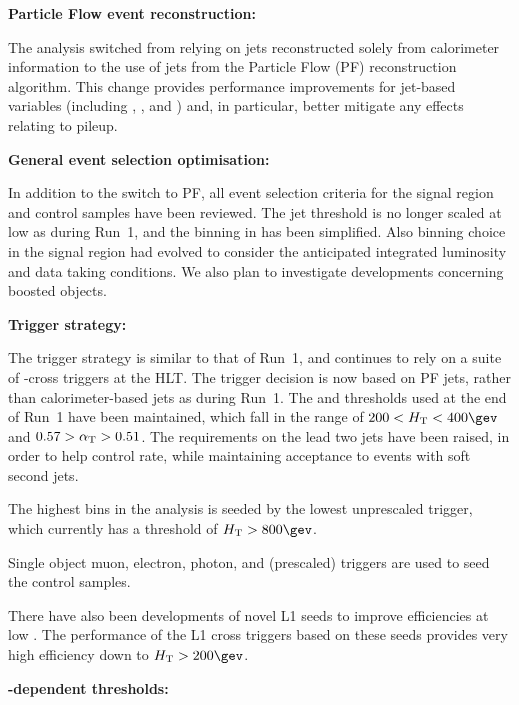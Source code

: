 {\bf Particle Flow event reconstruction:}

The analysis switched from relying on jets reconstructed solely
from calorimeter information to the use of jets from the Particle Flow
(PF) reconstruction algorithm. This change provides performance
improvements for jet-based variables (including \scalht, \mht, and
\alphat) and, in particular, better mitigate any effects relating to
pileup.

{\bf General event selection optimisation:}

In addition to the switch to PF, all event selection criteria for the
signal region and control samples have been reviewed. The jet
\Pt threshold is no longer scaled at low \scalht as during Run~1, and
the binning in \scalht has been simplified. Also binning choice in the
signal region had evolved to consider the anticipated integrated luminosity and 
data taking conditions.  We also plan to investigate developments concerning 
\eg boosted objects.

{\bf Trigger strategy:}

The trigger strategy is similar to that of Run~1, and continues
to rely on a suite of \scalht-\alphat cross triggers at the HLT. The
trigger decision is now based on PF jets, rather than
calorimeter-based jets as during Run~1. The \HT and \alphat thresholds
used at the end of Run~1 have been maintained, which fall in the range
of $200 < \scalht < 400\gev$ and $0.57 > \alpha_{\text{T}} > 0.51$. The \Pt
requirements on the lead two jets have been raised, in order to help
control rate, while maintaining acceptance to events with soft second
jets. 

The highest \scalht bins in the analysis is seeded by the lowest
unprescaled \scalht trigger, which currently has a threshold of
$\scalht > 800\gev$.

Single object muon, electron, photon, and (prescaled) \HT triggers
are used to seed the control samples. 

There have also been developments of novel L1 seeds to improve
efficiencies at low \scalht. The performance of the
L1 cross triggers based on these seeds provides very high efficiency 
down to $\scalht > 200\gev$.

{\bf \scalht-dependent \alphat thresholds:}

